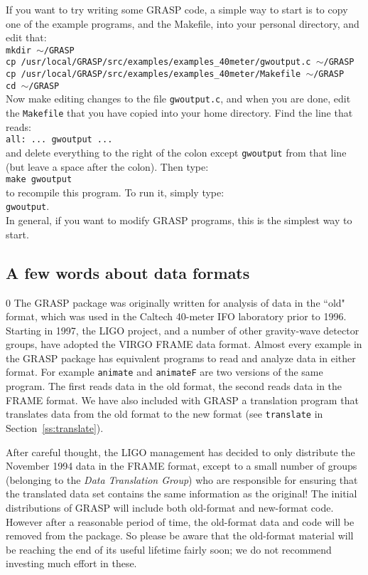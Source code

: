 If you want to try writing some GRASP code, a simple way to start is to 
copy one of the example programs, and the Makefile, into your personal directory,
and edit that:\\
{\tt mkdir $\sim$/GRASP}\\
{\tt cp /usr/local/GRASP/src/examples/examples\_40meter/gwoutput.c $\sim$/GRASP}\\
{\tt cp /usr/local/GRASP/src/examples/examples\_40meter/Makefile $\sim$/GRASP}\\
{\tt cd $\sim$/GRASP}\\
Now make editing changes to the file {\tt gwoutput.c}, and when you are
done, edit the {\tt Makefile} that you have
copied into your home directory.  Find the line that reads:\\
{\tt all: ... gwoutput ...}\\
and delete everything to the right of the colon except {\tt gwoutput} from that
line (but leave a space after the colon).  Then type:\\
{\tt make gwoutput}\\
to recompile this program.  To run it, simply type:\\
{\tt gwoutput}.\\
In general, if you want to modify GRASP programs, this is the simplest way to start.

\subsection{A few words about data formats}
\label{ss:dataformats}
\setcounter{equation}0
The GRASP package was originally written for analysis of data in the
``old" format, which was used in the Caltech 40-meter IFO laboratory
prior to 1996.  Starting in 1997, the LIGO project, and a number of other
gravity-wave detector groups, have adopted the VIRGO FRAME data format.
Almost every example in the GRASP package has equivalent programs to
read and analyze data in either format.  For example {\tt animate}
and {\tt animateF} are two versions of the same program.  The first
reads data in the old format, the second reads data in the FRAME format.
We have also included with GRASP a translation program that translates
data from the old format to the new format (see {\tt translate} in
Section~\ref{ss:translate}).

After careful thought, the LIGO management has decided to only distribute
the November 1994 data in the FRAME format, except to a small number of
groups (belonging to the {\it Data Translation Group}) who are responsible
for ensuring that the translated data set contains the same information
as the original!  The initial distributions of GRASP will include both
old-format and new-format code.  However after a reasonable period of
time, the old-format data and code will be removed from the package.
So please be aware that the old-format material will be reaching the
end of its useful lifetime fairly soon; we do not recommend investing
much effort in these.

